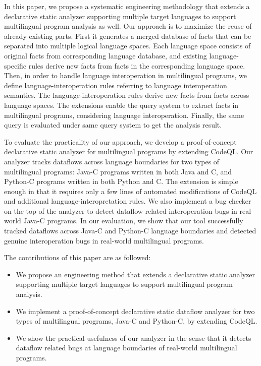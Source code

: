 In this paper, we propose a systematic engineering methodology that extends a
declarative static analyzer supporting multiple target languages to support
multilingual program analysis as well. Our approach is to maximize the reuse of
already existing parts. First it generates a merged database of facts that can
be separated into multiple logical language spaces.  Each language space
consists of original facts from corresponding language database, and existing
language-specific rules derive new facts from facts in the corresponding
language space. Then, in order to handle language interoperation in
multilingual programs, we define language-interoperation rules referring to
language interoperation semantics. The language-interoperation rules derive new
facts from facts across language spaces. The extensions enable the query system
to extract facts in multilingual programs, considering language interoperation.
Finally, the same query is evaluated under same query system to get the
analysis result.

To evaluate the practicality of our approach, we develop a proof-of-concept
declarative static analyzer for multilingual programs by extending CodeQL. Our
analyzer tracks dataflows across language boundaries for two types of
multilingual programs: Java-C programs written in both Java and C, and Python-C
programs written in both Python and C. The extension is simple enough in that
it requires only a few lines of automated modifications of CodeQL and additional
language-interopretation rules. We also implement a bug checker on the top of
the analyzer to detect dataflow related interoperation bugs in real world Java-C programs.
In our evaluation, we show that our tool successfully tracked dataflows across
Java-C and Python-C language boundaries and detected genuine interoperation
bugs in real-world multilingual programs.

The contributions of this paper are as followed:
\begin{itemize}
\item We propose an engineering method that extends a declarative static analyzer
supporting multiple target languages to support multilingual program analysis.

\item We implement a proof-of-concept declarative static dataflow analyzer for two
types of multilingual programs, Java-C and Python-C, by extending CodeQL.

\item We show the practical usefulness of our analyzer in the sense that it detects
dataflow related bugs at language boundaries of real-world multilingual
programs.
\end{itemize}
